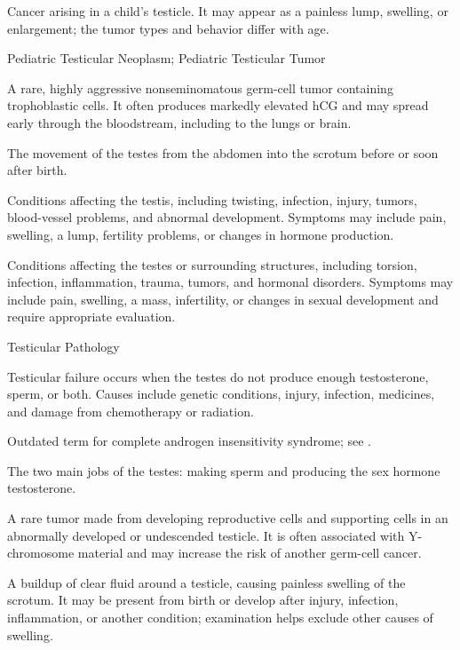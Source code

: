  Cancer arising in a child’s testicle. It may appear as a painless lump, swelling, or enlargement; the tumor types and behavior differ with age.

\synonyms
Pediatric Testicular Neoplasm; Pediatric Testicular Tumor

 A rare, highly aggressive nonseminomatous germ-cell tumor containing trophoblastic cells. It often produces markedly elevated hCG and may spread early through the bloodstream, including to the lungs or brain.

 The movement of the testes from the abdomen into the scrotum before or soon after birth.

 Conditions affecting the testis, including twisting, infection, injury, tumors, blood-vessel problems, and abnormal development. Symptoms may include pain, swelling, a lump, fertility problems, or changes in hormone production.

 Conditions affecting the testes or surrounding structures, including torsion, infection, inflammation, trauma, tumors,
and hormonal disorders. Symptoms may include pain, swelling, a mass, infertility, or
changes in sexual development and require appropriate evaluation.

\synonyms
Testicular Pathology

 Testicular failure occurs when the testes do not produce enough testosterone, sperm, or both. Causes include genetic conditions, injury, infection, medicines, and damage from chemotherapy or radiation.

 Outdated term for complete androgen insensitivity syndrome; see .

 The two main jobs of the testes: making sperm and producing the sex hormone testosterone.

 A rare tumor made from developing reproductive cells and supporting cells in an abnormally developed or undescended testicle. It is often associated with Y-chromosome material and may increase the risk of another germ-cell cancer.

 A buildup of clear fluid around a testicle, causing painless swelling of the scrotum. It may be present from birth or develop after injury, infection, inflammation, or another condition; examination helps exclude other causes of swelling.


